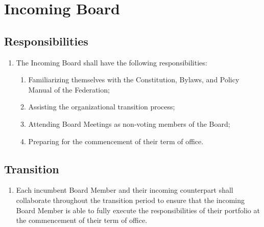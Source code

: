 \section{Incoming Board}
\label{incoming-board}

\subsection{Responsibilities}
\label{responsibilities-incoming-board}

\begin{enumerate}
 \item
  The Incoming Board shall have the following responsibilities:
  \begin{enumerate}
   \item
    Familiarizing themselves with the Constitution, Bylaws, and Policy Manual of the Federation;
   \item
    Assisting the organizational transition process;
   \item
    Attending Board Meetings as non-voting members of the Board;
   \item
    Preparing for the commencement of their term of office.
  \end{enumerate}
\end{enumerate}

\subsection{Transition}
\label{transition-incoming-board}

\begin{enumerate}
 \item
  Each incumbent Board Member and their incoming counterpart shall collaborate throughout the transition period to ensure that the incoming Board Member is able to fully execute the responsibilities of their portfolio at the commencement of their term of office.
\end{enumerate}
